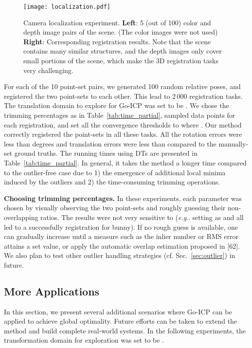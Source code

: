 \documentclass[10pt,journal,cspaper,compsoc]{IEEEtran}
\makeatletter
\DeclareRobustCommand\onedot{\futurelet\@let@token\@onedot}
\def\@onedot{\ifx\@let@token.\else.\null\fi\xspace}
\def\eg{\emph{e.g}\onedot} \def\Eg{\emph{E.g}\onedot}
\makeatother
\begin{document}
\begin{figure*}[!t]
\begin{center}
\texttt{[image: localization.pdf]}
\caption{Camera localization experiment. \textbf{Left}: 5 (out of 100) color and depth image pairs of the scene. (The color images were not used) \textbf{Right}: Corresponding registration results. Note that the scene contains many similar structures, and the depth images only cover small portions of the scene, which make the 3D
registration tasks very challenging.
\label{fig:localization}}
\end{center}
\vspace{-5pt}
\end{figure*}

For each of the 10 point-set pairs, we generated 100 random relative poses, and registered the two point-sets to each other. This lead to 2\,000 registration tasks. The translation domain to explore for Go-ICP was set to be . We chose the trimming percentages  as in Table~\ref{tab:time_partial}, sampled  data points for each registration, and set all the convergence thresholds to  where . Our method correctly registered the point-sets in all these tasks. All the rotation errors were less than  degrees and translation errors were less than  compared to the manually-set ground truths. The running times using DTs are presented in Table~\ref{tab:time_partial}. In general, it takes the method a longer time compared to the outlier-free case due to 1) the emergence of additional local minima induced by the outliers and 2) the time-consuming trimming operations.

\vspace{0.06in}
\noindent\textbf{Choosing trimming percentages.} In these experiments, each parameter  was chosen by visually observing the two point-sets and roughly guessing their non-overlapping ratios. The results were not very sensitive to  (\eg setting  as  and  all led to a successfully registration for bunny). If no rough guess is available, one can gradually increase  until a measure such as the inlier number or RMS error attains a set value, or apply the automatic overlap estimation proposed in [62]. We also plan to test other outlier handling strategies (cf. Sec.~\ref{sec:outlier}) in future.


\subsection{More Applications}\label{sec:exp_application}
In this section, we present several additional scenarios where Go-ICP can be applied to achieve global optimality. Future efforts can be taken to extend the method and build complete real-world systems. In the following experiments, the transformation domain for exploration was set to be .
\end{document}
